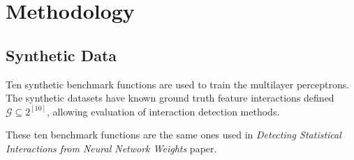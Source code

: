 \documentclass{article}
\begin{document}
\section{Methodology}
\label{sec:methodology}
\subsection{Synthetic Data} \label{sec:synth_data}
Ten synthetic benchmark functions are used to train the multilayer perceptrons. The synthetic datasets have known ground truth feature interactions defined \(\mathcal{G} \subseteq 2^{[10]}\), allowing evaluation of interaction detection methods.

These ten benchmark functions are the same ones used in \cite{tsang2017detecting} \textit{Detecting Statistical Interactions from Neural Network Weights} paper.
\end{document}
